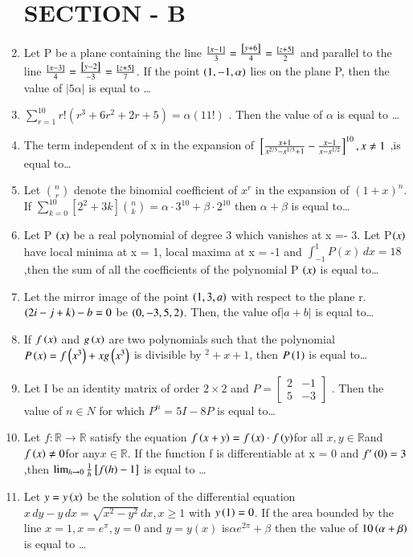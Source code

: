 \documentclass[journal,12pt,twocolumn]{IEEEtran}
\theoremstyle{remark}
\begin{document}
\begin{enumerate}[start=16]
\section{SECTION - B}
\item Let P be a plane containing the line $
\frac{{}\left[x - 1\right]}{3} = \frac{{}\left[y + 6\right]}{4} = \frac{{}\left[z + 5\right]}{2} $ and parallel to the line $
\frac{{}\left[x - 3\right]}{4} = \frac{{}\left[y - 2\right]}{-3} = \frac{{}\left[z + 5\right]}{7} $. If the point $\left(1,-1,\alpha\right)$ lies on the plane P, then the value of $|5\alpha|$ is equal to \dots
\item $
\sum_{r=1}^{10} r!( r^3 + 6r^2 + 2r + 5 ) = \alpha (11!)$ . Then the value of $\alpha$ is equal to \dots
\item The term independent of x in the expansion of $
{}\left[ \frac{x + 1}{x^{2/3} - x^{1/3} + 1} - \frac{x - 1}{x - x^{1/2}} \right]^{10} , x \neq 1$ ,is equal to\dots
\item  Let $ \binom{n}{r} $ denote the binomial coefficient of $ x^r $ in the expansion of $ (1+x)^n $. If 
    $
    \sum_{k=0}^{10} [2^2 + 3k] \binom{n}{k} = \alpha \cdot 3^{10} + \beta \cdot 2^{10}
    $ 
then $\alpha + \beta$ is equal to\dots
\item  Let P $\left(x\right)$ be a real polynomial of degree 3 which vanishes at x =- 3. Let P$\left(x\right)$ have local minima at x = 1, local maxima at x = -1 and $
\int_{-1}^{1} P(x) \, dx = 18
$,then the sum of all the coefficients of the polynomial P $\left(x\right)$ is equal to\dots
\item   Let the mirror image of the point $\left(1, 3, a\right)$ with respect to the plane r. $\left(2i - j + k\right) - b = 0$ be $\left(0,-3, 5, 2\right)$. Then, the value of$ |a + b|$ is equal to\dots
\item If $f\left(x\right)$ and $g\left(x\right)$ are two polynomials such that the polynomial $P \left(x\right) = f \left(x^3\right) + x g \left(x^3\right)$ is divisible by $^2 + x + 1$, then $P \left(1\right)$ is equal to\dots
\item  Let I be an identity matrix of order $2 \times 2$  and $
P = \begin{bmatrix} 
2 & -1 \\ 
5 & -3 
\end{bmatrix}
$ . Then the value of $n\in N$ for which $P^n=5I-8P$ is equal to\dots
\item Let  $f : \mathbb{R} \to \mathbb{R}$ satisfy the equation 
$
f\left(x + y\right) = f\left(x\right) \cdot f\left(y\right)$for all $x, y \in \mathbb{R} $and $ f\left(x\right) \neq 0 $for any$ x \in \mathbb{R}
$. If the function f is differentiable at x = 0 and $f'\left(0\right)=3$,then $
\lim_{h \to 0} \frac{1}{h}  {}\left[f(h) - 1 \right]$ is equal to \dots
\item Let $y = y \left(x\right)$ be the solution of the differential equation $x \, dy - y \, dx = \sqrt{x^2 - y^2} \, dx, x \geq 1
$ with $y\left(1\right)=0$. If the area bounded by the line $x = 1, x = e^\pi, y = 0$ and $y = y(x)$ is$ \alpha e^{2\pi} + \beta $ then the value of $10 \left(\alpha + \beta\right)$ is equal to \dots







\end{enumerate}
\end{document}
